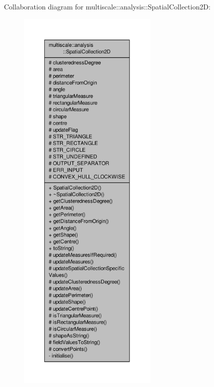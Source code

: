 Collaboration diagram for multiscale\-:\-:analysis\-:\-:Spatial\-Collection2\-D\-:
\nopagebreak
\begin{figure}[H]
\begin{center}
\leavevmode
\includegraphics[height=550pt]{classmultiscale_1_1analysis_1_1SpatialCollection2D__coll__graph}
\end{center}
\end{figure}
